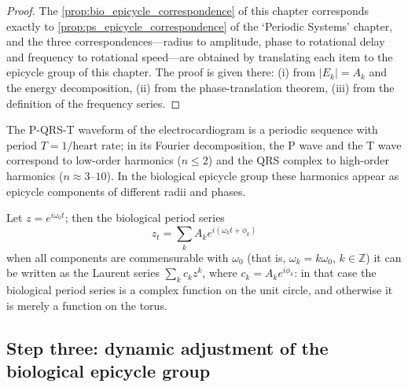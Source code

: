 \begin{proof}
The \cref{prop:bio_epicycle_correspondence} of this chapter corresponds exactly to \cref{prop:ps_epicycle_correspondence} of the `Periodic Systems' chapter,
and the three correspondences---radius to amplitude, phase to rotational delay and frequency to rotational speed---are obtained by translating each item to the epicycle group of this chapter.
The proof is given there: (i) from $|E_k|=A_k$ and the energy decomposition, (ii) from the phase-translation theorem, (iii) from the definition of the frequency series.
\end{proof}

\begin{example}\label{ex:bio_ecg_series}
The P-QRS-T waveform of the electrocardiogram is a periodic sequence with period $T=1/\text{heart rate}$; in its Fourier decomposition, the P wave and the T wave correspond to low-order harmonics ($n\le 2$) and the QRS complex to high-order harmonics ($n\approx 3$--$10$). In the biological epicycle group these harmonics appear as epicycle components of different radii and phases.
\end{example}

\begin{remark}\label{rem:bio_series_complex}
Let $z=e^{i\omega_0t}$; then the biological period series
\[
z_t=\sum_k A_k e^{i(\omega_k t+\phi_k)}
\]
when all components are commensurable with $\omega_0$ (that is, $\omega_k=k\omega_0$, $k\in\mathbb Z$) it can be written as the Laurent series $\sum_k c_k z^k$, where $c_k=A_k e^{i\phi_k}$: in that case the biological period series is a complex function on the unit circle, and otherwise it is merely a function on the torus.
\end{remark}

\subsection{Step three: dynamic adjustment of the biological epicycle group}

